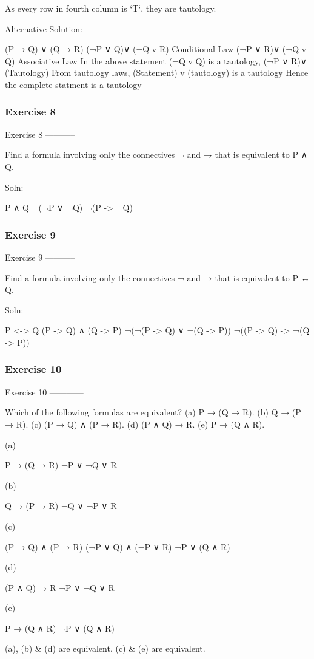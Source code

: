 As every row in fourth column is `T`, they are tautology.

Alternative Solution:

    (P → Q) ∨ (Q → R)
    (¬P ∨ Q)∨ (¬Q v R)   Conditional Law
    (¬P ∨ R)∨ (¬Q v Q)   Associative Law
    In the above statement (¬Q v Q) is a tautology,
    (¬P ∨ R)∨ (Tautology)
    From tautology laws, (Statement) v (tautology) is a tautology
    Hence the complete statment is a tautology

\subsubsection{Exercise 8}
Exercise 8
-----------

    Find a formula involving only the connectives ¬ and → that is equivalent
    to P ∧ Q.

Soln:

    P ∧ Q
    ¬(¬P ∨ ¬Q)
    ¬(P -> ¬Q)

\subsubsection{Exercise 9}
Exercise 9
-----------

    Find a formula involving only the connectives ¬ and → that is equivalent
    to P ↔ Q.

Soln:

    P <-> Q
    (P -> Q) ∧ (Q -> P)
    ¬(¬(P -> Q) ∨ ¬(Q -> P))
    ¬((P -> Q) -> ¬(Q -> P))

\subsubsection{Exercise 10}
Exercise 10
------------

    Which of the following formulas are equivalent?
    (a) P → (Q → R).
    (b) Q → (P → R).
    (c) (P → Q) ∧ (P → R).
    (d) (P ∧ Q) → R.
    (e) P → (Q ∧ R).

(a)

    P → (Q → R)
    ¬P ∨ ¬Q ∨ R

(b)

    Q → (P → R)
    ¬Q ∨ ¬P ∨ R

(c)

    (P → Q) ∧ (P → R)
    (¬P ∨ Q) ∧ (¬P ∨ R)
    ¬P ∨ (Q ∧ R)

(d)

    (P ∧ Q) → R
    ¬P ∨ ¬Q ∨ R

(e)

    P → (Q ∧ R)
    ¬P ∨ (Q ∧ R)

(a), (b) & (d) are equivalent.
(c) & (e) are equivalent.
